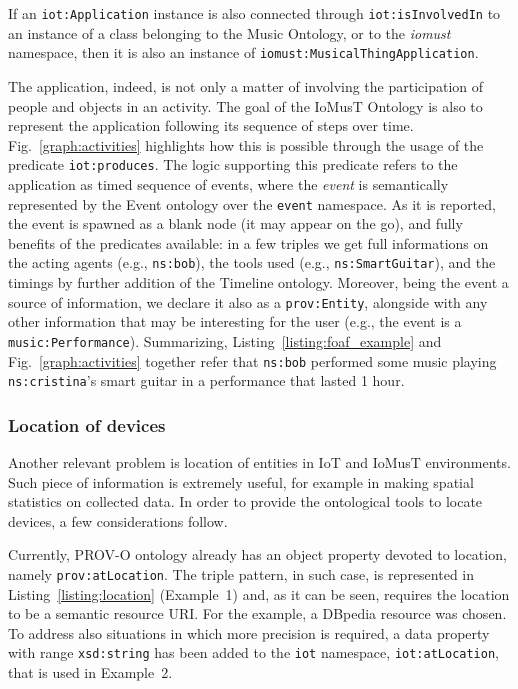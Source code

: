 \begin{rul}
\label{rule:musical_application}
    If an \texttt{iot:Application} instance is also connected through \texttt{iot:isInvolvedIn} to an instance of a class belonging to the Music Ontology, or to the \textit{iomust} namespace, then it is also an instance of \texttt{iomust:MusicalThingApplication}. 
\end{rul}

The application, indeed, is not only a matter of involving the participation of people and objects in an activity. The goal of the IoMusT Ontology is also to represent the application following its sequence of steps over time. Fig.~\ref{graph:activities} highlights how this is possible through the usage of the predicate \texttt{iot:produces}. The logic supporting this predicate refers to the application as timed sequence of events, where the \textit{event} is semantically represented by the Event  ontology over the \texttt{event} namespace. As it is reported, the event is spawned as a blank node (it may appear on the go), and fully benefits of the predicates available: in a few triples we get full informations on the acting agents (e.g., \texttt{ns:bob}), the tools used (e.g., \texttt{ns:SmartGuitar}), and the timings by further addition of the Timeline  ontology. Moreover, being the event a source of information, we declare it also as a \texttt{prov:Entity}, alongside with any other information that may be interesting for the user (e.g., the event is a \texttt{music:Performance}). Summarizing, Listing~\ref{listing:foaf_example} and Fig.~\ref{graph:activities} together refer that \texttt{ns:bob} performed some music playing \texttt{ns:cristina}'s smart guitar in a performance that lasted 1 hour.

\subsubsection{\textsf{Location of devices}}
Another relevant problem is location of entities in IoT and IoMusT environments. Such piece of information is extremely useful, for example in making spatial statistics on collected data. In order to provide the ontological tools to locate devices, a few considerations follow.

Currently, PROV-O ontology already has an object property devoted to location, namely \texttt{prov:atLocation}. The triple pattern, in such case, is represented in Listing~\ref{listing:location} (Example~1) and, as it can be seen, requires the location to be a semantic resource URI. For the example, a DBpedia resource was chosen. To address also situations in which more precision is required, a data property with range \texttt{xsd:string} has been added to the \texttt{iot} namespace, \texttt{iot:atLocation}, that is used in Example~2.

